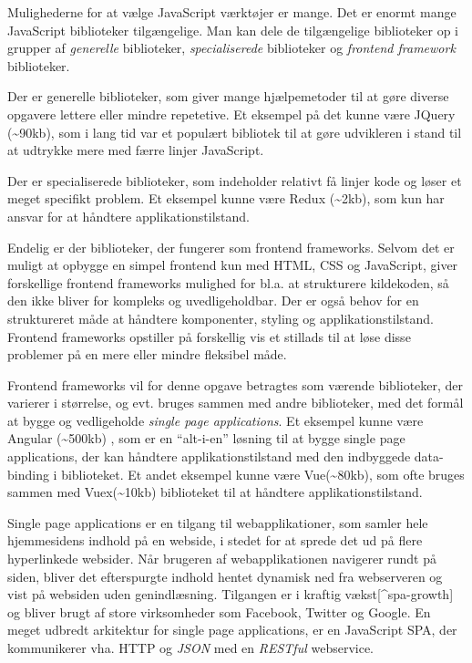 \documentclass[]{article}
\begin{document}
Mulighederne for at vælge JavaScript værktøjer er mange. Det er enormt
mange JavaScript biblioteker tilgængelige. Man kan dele de tilgængelige
biblioteker op i grupper af \emph{generelle} biblioteker,
\emph{specialiserede} biblioteker og \emph{frontend framework}
biblioteker.

Der er generelle biblioteker, som giver mange hjælpemetoder til at gøre
diverse opgavere lettere eller mindre repetetive. Et eksempel på det
kunne være JQuery (\textasciitilde{}90kb), som i lang tid var et
populært bibliotek til at gøre udvikleren i stand til at udtrykke mere
med færre linjer JavaScript.

Der er specialiserede biblioteker, som indeholder relativt få linjer
kode og løser et meget specifikt problem. Et eksempel kunne være Redux
(\textasciitilde{}2kb), som kun har ansvar for at håndtere
applikationstilstand.

Endelig er der biblioteker, der fungerer som frontend frameworks. Selvom
det er muligt at opbygge en simpel frontend kun med HTML, CSS og
JavaScript, giver forskellige frontend frameworks mulighed for bl.a. at
strukturere kildekoden, så den ikke bliver for kompleks og
uvedligeholdbar. Der er også behov for en struktureret måde at håndtere
komponenter, styling og applikationstilstand. Frontend frameworks
opstiller på forskellig vis et stillads til at løse disse problemer på
en mere eller mindre fleksibel måde.

Frontend frameworks vil for denne opgave betragtes som værende
biblioteker, der varierer i størrelse, og evt. bruges sammen med andre
biblioteker, med det formål at bygge og vedligeholde \emph{single page
applications}. Et eksempel kunne være Angular (\textasciitilde{}500kb) ,
som er en ``alt-i-en'' løsning til at bygge single page applications,
der kan håndtere applikationstilstand med den indbyggede data-binding i
biblioteket. Et andet eksempel kunne være Vue(\textasciitilde{}80kb),
som ofte bruges sammen med Vuex(\textasciitilde{}10kb) biblioteket til
at håndtere applikationstilstand.

Single page applications er en tilgang til webapplikationer, som samler
hele hjemmesidens indhold på en webside, i stedet for at sprede det ud
på flere hyperlinkede websider. Når brugeren af webapplikationen
navigerer rundt på siden, bliver det efterspurgte indhold hentet
dynamisk ned fra webserveren og vist på websiden uden genindlæsning.
Tilgangen er i kraftig vækst{[}\^{}spa-growth{]} og bliver brugt af
store virksomheder som Facebook, Twitter og Google. En meget udbredt
arkitektur for single page applications, er en JavaScript SPA, der
kommunikerer vha. HTTP og \emph{JSON} med en \emph{RESTful} webservice.
\end{document}
